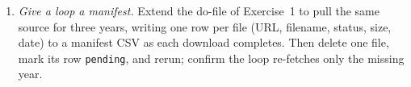 \begin{enumerate}
    \texttt{combineall using "built/cars\_panel", cmethod(append)
    directory("raw/") map("map.csv")}, then \texttt{use} the result
    and confirm from the harmonization table and
    \texttt{char list price[source]} that the two years stacked into
    a single \texttt{price} column that records its 2020 provenance.
  \item \emph{Give a loop a manifest.} Extend the do-file of
    Exercise~1 to pull the same source for three years, writing one
    row per file (URL, filename, status, size, date) to a manifest
    CSV as each download completes. Then delete one file, mark its
    row \texttt{pending}, and rerun; confirm the loop re-fetches
    only the missing year.
\end{enumerate}

